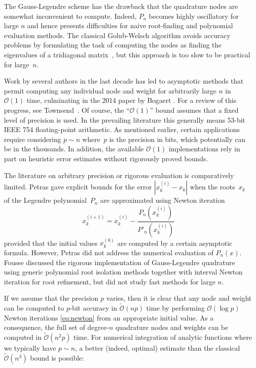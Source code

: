 \documentclass{siamart0216}
\newcommand{\OO}{\mathcal{O}}
\newcommand{\OOtilde}{\widetilde{\mathcal{O}}}
\begin{document}
The Gauss-Legendre scheme has the drawback
that the quadrature nodes are
somewhat inconvenient to compute.
Indeed, $P_n$ becomes highly oscillatory for
large $n$ and hence presents difficulties
for naive root-finding and polynomial evaluation methods.
The classical Golub-Welsch algorithm avoids accuracy problems
by formulating the task of computing the nodes as
finding the eigenvalues of a tridiagonal matrix~\cite{golub1969calculation},
but this approach is too slow to be practical for large~$n$.

Work by several authors in the last decade has led to asymptotic methods
that permit computing any individual node and weight for arbitrarily large $n$
in $\OO(1)$ time, culminating in the 2014 paper by Bogaert \cite{bogaert2014iteration}.
For a review of this progress, see Townsend~\cite{townsend2015race}.
Of course, the ``$\OO(1)$'' bound assumes that a fixed
level of precision is used. In the prevailing literature
this generally means 53-bit IEEE 754 floating-point arithmetic.
As mentioned earlier, certain applications require
considering $p \sim n$ where~$p$ is the precision in bits,
which potentially can be in the thousands.
In addition, the available $\OO(1)$ implementations rely in part
on heuristic error estimates without rigorously proved bounds.

The literature on arbitrary precision or rigorous evaluation
is comparatively limited.
Petras \cite{petras1999computation} gave explicit
bounds for the error $|x_k^{(i)} - x_k|$ when
the roots $x_k$ of the Legendre polynomial $P_n$
are approximated using Newton iteration
\begin{equation}
\label{eq:newton}
x^{(i+1)}_k = x^{(i)}_k - \frac{P_n(x^{(i)}_k)}{P'_n(x^{(i)}_k)}
\end{equation}
provided that the initial values $x^{(0)}_k$
are computed by a certain asymptotic formula.
However, Petras did not address the numerical evaluation of $P_n(x)$.
Fousse \cite{fousse2007accurate} discussed the rigorous implementation
of Gauss-Legendre quadrature
using generic polynomial root isolation methods together with
interval Newton iteration
for root refinement,
but did not study fast methods for large $n$.

If we assume that the precision $p$ varies,
then it is clear that any node and weight
can be computed to $p$-bit accuracy in $\OOtilde(n p)$ time
by performing $\OO(\log p)$ Newton iterations \eqref{eq:newton}
from an appropriate initial value.
As a consequence, the
full set of degree-$n$ quadrature nodes and weights
can be computed in $\OOtilde(n^2 p)$ time.
For numerical integration of analytic functions
where we typically have $p \sim n$, a better (indeed, optimal) estimate
than the classical $\OOtilde(n^3)$ bound is possible:
\end{document}

